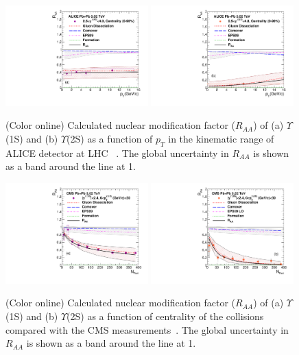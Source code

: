 {\begin{figure}
\includegraphics[width=0.49\textwidth]{Figures/Quarkonia_502TeV/Fig8a_ALICE_Y1SRAAPt_Shade.pdf}
\includegraphics[width=0.49\textwidth]{Figures/Quarkonia_502TeV/Fig8b_ALICE_Y2SRAAPt_Shade.pdf}
\caption{(Color online) Calculated nuclear modification factor ($R_{AA}$) \cite{Kumar:2019xdj}
  of (a) $\Upsilon$(1S) and 
  (b) $\Upsilon$(2S) as a function of $p_{T}$ in the kinematic range of ALICE detector
at LHC ~\cite{ALICE:2020wwx}. The global uncertainty in $R_{AA}$ is shown as a band
around the line at 1.
} 
\label{fig:UpsilonRaaPtALICE}
\end{figure}

\begin{figure}
\includegraphics[width=0.49\textwidth]{Figures/Quarkonia_502TeV/Fig9a_CMS_Y1SRAANPart_Shade.pdf}
\includegraphics[width=0.49\textwidth]{Figures/Quarkonia_502TeV/Fig9b_CMS_Y2SRAANPart_Shade.pdf}
\caption{(Color online) Calculated nuclear modification factor ($R_{AA}$) \cite{Kumar:2019xdj} of 
  (a) $\Upsilon$(1S) and (b) $\Upsilon$(2S) as a function of centrality of the 
  collisions compared with the CMS measurements~\cite{Sirunyan:2018nsz}.%
  The global uncertainty in $R_{AA}$ is shown as a band around the line at 1.
}
\label{fig:UpsilonRaaNPartCMS}
\end{figure}


}

